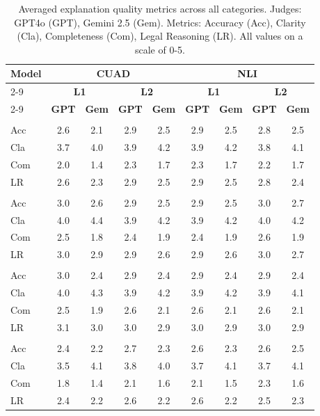 \documentclass[11pt]{article}
\begin{document}
\begin{table}[h!]
\centering
\scriptsize
\setlength{\tabcolsep}{2.5pt}
\renewcommand{\arraystretch}{1.15}
\begin{tabular}{l|cccc|cccc}
\hline
\multirow{3}{*}{\textbf{Model}} &
\multicolumn{4}{c|}{\textbf{CUAD}} &
\multicolumn{4}{c}{\textbf{NLI}} \\
\cline{2-9}
 & \multicolumn{2}{c|}{\textbf{L1}} &
  \multicolumn{2}{c|}{\textbf{L2}} &
  \multicolumn{2}{c|}{\textbf{L1}} &
  \multicolumn{2}{c}{\textbf{L2}} \\
\cline{2-9}
 & \textbf{GPT} & \textbf{Gem} & \textbf{GPT} & \textbf{Gem} &
  \textbf{GPT} & \textbf{Gem} & \textbf{GPT} & \textbf{Gem} \\
\hline
\rowcolor{lightestgray}
\multicolumn{9}{c}{\textbf{GPT-4o-mini}} \\
\hline
Acc & 2.6 & 2.1 & 2.9 & 2.5 & 2.9 & 2.5 & 2.8 & 2.5 \\
Cla & 3.7 & 4.0 & 3.9 & 4.2 & 3.9 & 4.2 & 3.8 & 4.1 \\
Com & 2.0 & 1.4 & 2.3 & 1.7 & 2.3 & 1.7 & 2.2 & 1.7 \\
LR & 2.6 & 2.3 & 2.9 & 2.5 & 2.9 & 2.5 & 2.8 & 2.4 \\
\hline
\rowcolor{lightestgray}
\multicolumn{9}{c}{\textbf{Gemini-2.0}} \\
\hline
Acc & 3.0 & 2.6 & 2.9 & 2.5 & 2.9 & 2.5 & 3.0 & 2.7 \\
Cla & 4.0 & 4.4 & 3.9 & 4.2 & 3.9 & 4.2 & 4.0 & 4.2 \\
Com & 2.5 & 1.8 & 2.4 & 1.9 & 2.4 & 1.9 & 2.6 & 1.9 \\
LR & 3.0 & 2.9 & 2.9 & 2.6 & 2.9 & 2.6 & 3.0 & 2.7 \\
\hline
\rowcolor{lightestgray}
\multicolumn{9}{c}{\textbf{Gemini-2.5}} \\
\hline
Acc & 3.0 & 2.4 & 2.9 & 2.4 & 2.9 & 2.4 & 2.9 & 2.4 \\
Cla & 4.0 & 4.3 & 3.9 & 4.2 & 3.9 & 4.2 & 3.9 & 4.1 \\
Com & 2.5 & 1.9 & 2.6 & 2.1 & 2.6 & 2.1 & 2.6 & 2.1 \\
LR & 3.1 & 3.0 & 3.0 & 2.9 & 3.0 & 2.9 & 3.0 & 2.9 \\
\hline
\rowcolor{lightestgray}
\multicolumn{9}{c}{\textbf{Llama-3.3}} \\
\hline
Acc & 2.4 & 2.2 & 2.7 & 2.3 & 2.6 & 2.3 & 2.6 & 2.5 \\
Cla & 3.5 & 4.1 & 3.8 & 4.0 & 3.7 & 4.1 & 3.7 & 4.1 \\
Com & 1.8 & 1.4 & 2.1 & 1.6 & 2.1 & 1.5 & 2.3 & 1.6 \\
LR & 2.4 & 2.2 & 2.6 & 2.2 & 2.6 & 2.2 & 2.5 & 2.3 \\
\hline
\end{tabular}
\caption{Averaged explanation quality metrics across all categories. Judges: GPT4o (GPT), Gemini 2.5 (Gem). Metrics: Accuracy (Acc), Clarity (Cla), Completeness (Com), Legal Reasoning (LR). All values on a scale of 0-5.}
\label{tab:eval3_explanation_collapsed}
\end{table}
\end{document}
